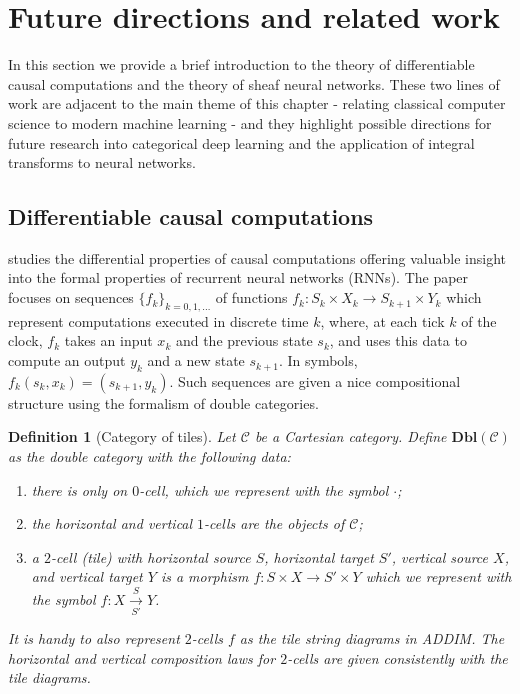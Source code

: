 \documentclass[11pt,a4paper,openright,twoside]{report}
\theoremstyle{plain}
\newtheorem{definition}[proposition]{Definition}
\theoremstyle{definition}
\begin{document}
\section{Future directions and related work}

In this section we provide a brief introduction to the theory of differentiable causal computations and the theory of sheaf neural networks. These two lines of work are adjacent to the main theme of this chapter - relating classical computer science to modern machine learning - and they highlight possible directions for future research into categorical deep learning and the application of integral transforms to neural networks.

\subsection{Differentiable causal computations}

\cite{sprunger2019differentiable} studies the differential properties of causal computations offering valuable insight into the formal properties of recurrent neural networks (RNNs). The paper focuses on sequences $\{f_k\}_{k=0,1,\dots}$ of functions $f_k: S_k \times X_k \to S_{k+1} \times Y_k$ which represent computations executed in discrete time $k$, where, at each tick $k$ of the clock, $f_k$ takes an input $x_k$ and the previous state $s_k$, and uses this data to compute an output $y_k$ and a new state $s_{k+1}$. In symbols, $f_k(s_k,x_k) = (s_{k+1},y_k)$. Such sequences are given a nice compositional structure using the formalism of double categories.

\begin{definition}[Category of tiles]
  Let $\mathcal{C}$ be a Cartesian category. Define $\mathbf{Dbl}(\mathcal{C})$ as the double category with the following data:
  \begin{enumerate}
    \item there is only on $0$-cell, which we represent with the symbol $\cdot$;
    \item the horizontal and vertical $1$-cells are the objects of $\mathcal{C}$;
    \item a $2$-cell (tile) with horizontal source $S$, horizontal target $S'$, vertical source $X$, and vertical target $Y$ is a morphism $f: S \times X \to S' \times Y$ which we represent with the symbol $f:X \overset{S}{\underset{S'}\longrightarrow} Y$.
  \end{enumerate}
  It is handy to also represent $2$-cells $f$ as the tile string diagrams in ADDIM. The horizontal and vertical composition laws for $2$-cells are given consistently with the tile diagrams.
\end{definition}
\end{document}
